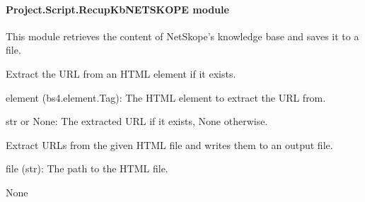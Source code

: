 \documentclass[letterpaper,10pt,english]{sphinxmanual}
\begin{document}
\paragraph{Project.Script.RecupKbNETSKOPE module}
\label{\detokenize{Project.Script:module-Project.Script.RecupKbNETSKOPE}}\label{\detokenize{Project.Script:project-script-recupkbnetskope-module}}
\sphinxAtStartPar
This module retrieves the content of NetSkope’s knowledge base and saves it to a file.

\begin{fulllineitems}
\label{\detokenize{Project.Script:Project.Script.RecupKbNETSKOPE.extract_urls}}
\pysigstartsignatures
{}
\pysigstopsignatures
\sphinxAtStartPar
Extract the URL from an HTML element if it exists.
\begin{description}
\sphinxAtStartPar
element (bs4.element.Tag): The HTML element to extract the URL from.

\sphinxAtStartPar
str or None: The extracted URL if it exists, None otherwise.

\end{description}

\end{fulllineitems}


\begin{fulllineitems}
\label{\detokenize{Project.Script:Project.Script.RecupKbNETSKOPE.generateAllPagesUrls}}
\pysigstartsignatures
{}
\pysigstopsignatures
\sphinxAtStartPar
Extract URLs from the given HTML file and writes them to an output file.
\begin{description}
\sphinxAtStartPar
file (str): The path to the HTML file.

\sphinxAtStartPar
None

\end{description}

\end{fulllineitems}
\end{document}
